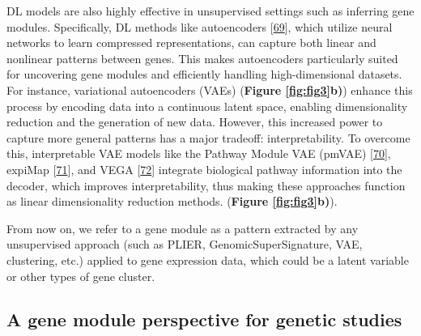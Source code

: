 DL models are also highly effective in unsupervised settings such as inferring gene modules.
Specifically, DL methods like autoencoders {[}\protect\hyperlink{ref-NLVTJ9Lj}{69}{]}, which utilize neural networks to learn compressed representations, can capture both linear and nonlinear patterns between genes.
This makes autoencoders particularly suited for uncovering gene modules and efficiently handling high-dimensional datasets.
For instance, variational autoencoders (VAEs) (\textbf{Figure \ref{fig:fig3}b)}) enhance this process by encoding data into a continuous latent space, enabling dimensionality reduction and the generation of new data.
However, this increased power to capture more general patterns has a major tradeoff: interpretability.
To overcome this, interpretable VAE models like the Pathway Module VAE (pmVAE) {[}\protect\hyperlink{ref-nGVsOd2S}{70}{]}, expiMap {[}\protect\hyperlink{ref-JkqcQgM7}{71}{]}, and VEGA {[}\protect\hyperlink{ref-170T6ip47}{72}{]} integrate biological pathway information into the decoder, which improves interpretability, thus making these approaches function as linear dimensionality reduction methods.
(\textbf{Figure \ref{fig:fig3}b)}).

From now on, we refer to a gene module as a pattern extracted by any unsupervised approach (such as PLIER, GenomicSuperSignature, VAE, clustering, etc.) applied to gene expression data, which could be a latent variable or other types of gene cluster.

\hypertarget{a-gene-module-perspective-for-genetic-studies}{%
\subsection{A gene module perspective for genetic studies}\label{a-gene-module-perspective-for-genetic-studies}}

